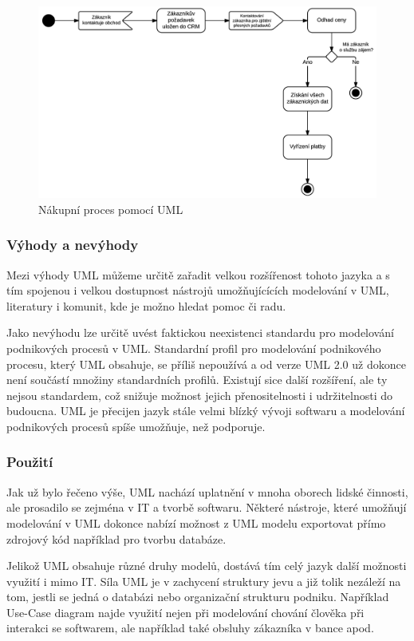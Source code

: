 \documentclass[]{article}
\begin{document}
\begin{figure}[H]\centering
\includegraphics[width=1.0\textwidth]{obrazky/uml_nakupniproces}
\caption{Nákupní proces pomocí UML}
\label{fig:UML_nakupniproces}
\end{figure}

\subsubsection{Výhody a nevýhody}
Mezi výhody UML můžeme určitě zařadit velkou rozšířenost tohoto jazyka a s tím spojenou i velkou dostupnost nástrojů umožňujícících modelování v UML, literatury i komunit, kde je možno hledat pomoc či radu.

Jako nevýhodu lze určitě uvést faktickou neexistenci standardu pro modelování podnikových procesů v UML. Standardní profil pro modelování podnikového procesu, který UML obsahuje, se příliš nepoužívá a od verze UML 2.0 už dokonce není součástí množiny standardních profilů. \cite{Repa2007} Existují sice další rozšíření, ale ty nejsou standardem, což snižuje možnost jejich přenositelnosti i udržitelnosti do budoucna. UML je přecijen jazyk stále velmi blízký vývoji softwaru a modelování podnikových procesů spíše umožňuje, než podporuje.

\subsubsection{Použití}
Jak už bylo řečeno výše, UML nachází uplatnění v mnoha oborech lidské činnosti, ale prosadilo se zejména v IT a tvorbě softwaru. Některé nástroje, které umožňují modelování v UML dokonce nabízí možnost z UML modelu exportovat přímo zdrojový kód například pro tvorbu databáze.

Jelikož UML obsahuje různé druhy modelů, dostává tím celý jazyk další možnosti využití i mimo IT. Síla UML je v zachycení struktury jevu a již tolik nezáleží na tom, jestli se jedná o databázi nebo organizační strukturu podniku. Například Use-Case diagram najde využití nejen při modelování chování člověka při interakci se softwarem, ale například také obsluhy zákazníka v bance apod. 
\end{document}
